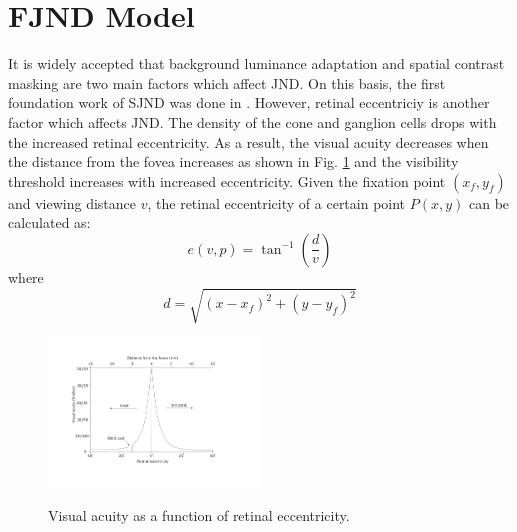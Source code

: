 \documentclass[journal]{IEEEtran}
\begin{document}
\section{FJND Model}
It is widely accepted that background luminance adaptation and spatial contrast masking are two main factors which affect JND. On this basis, the first foundation work of SJND was done in \cite{RN634}. However, retinal eccentriciy is another factor which affects JND. The density of the cone and ganglion cells drops with the increased retinal eccentricity. As a result, the visual acuity decreases when the distance from the fovea increases as shown in Fig. \ref{fig:AcuityEccentricity} and the visibility threshold increases with increased eccentricity. Given the fixation point $\left( x_f,y_f\right)$ and viewing distance $v$, the retinal eccentricity of a certain point $P\left(x,y\right)$ can be calculated as:
\begin{equation}
e\left (  v,p\right )=\tan^{-1}\left ( \frac{d}{v} \right )
\end{equation}
where \begin{equation}
d= \sqrt{\left ( x-x_f \right )^2+\left ( y-y_f \right )^2 }
\end{equation}
\begin{figure}[!t]
	\centering
	\includegraphics[width=0.5\textwidth]{acuity_eccentricity}\\
	\caption{Visual acuity as a function of retinal eccentricity.}
	\label{fig:AcuityEccentricity}
\end{figure}
\end{document}
